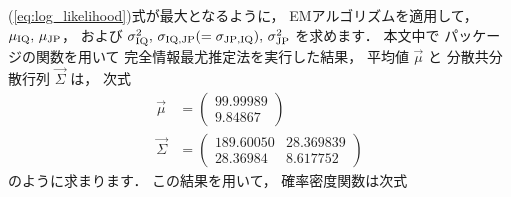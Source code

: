 \documentclass[a4j]{jarticle}\usepackage[]{graphicx}\usepackage[]{color}
\begin{document}
(\ref{eq:log_likelihood})式が最大となるように，
EMアルゴリズムを適用して，
$\mu_{\mathrm{IQ}}, \, \mu_{\mathrm{JP}}$，
および $\sigma_{\mathrm{IQ}}^2, \, \sigma_{\mathrm{IQ}, \mathrm{JP}}(=\sigma_{\mathrm{JP}, \mathrm{IQ}}), \, \sigma_{\mathrm{JP}}^2$ を求めます．
本文中で
パッケージの関数を用いて
完全情報最尤推定法を実行した結果，
平均値 $\vec{\mu}$ と
分散共分散行列 $\vec{\Sigma}$ は，
次式
\begin{align}
\vec{\mu} &=
  \left(
    \begin{array}{c}
    99.99989 \\
    9.84867
    \end{array}
  \right) \\
\vec{\Sigma} &= 
  \left(
    \begin{array}{cc}
    189.60050 & 28.369839 \\
    28.36984 &  8.617752
    \end{array}
  \right)
\end{align}
のように求まります．
この結果を用いて，
確率密度関数は次式
\end{document}
